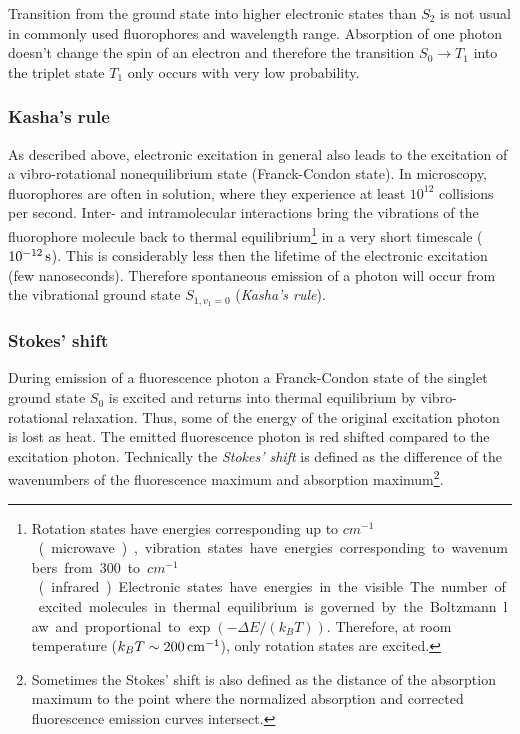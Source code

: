 Transition from the ground state into higher electronic states than
$S_2$ is not usual in commonly used fluorophores and wavelength range.
Absorption of one photon doesn't change the spin of an electron and
therefore the transition $S_0\rightarrow T_1$ into the triplet state
$T_1$ only occurs with very low probability.

\subsubsection{Kasha's rule}
As described above, electronic excitation in general also leads to the
excitation of a vibro-rotational nonequilibrium state (Franck-Condon
state). In microscopy, fluorophores are often in solution, where they
experience at least $10^{12}$ collisions per second. Inter- and
intramolecular interactions bring the vibrations of the fluorophore
molecule back to thermal equilibrium\footnote{Rotation states have
  energies corresponding up to \unit[100]{$cm^{-1}$} (microwave),
  vibration states have energies corresponding to wavenumbers from 300
  to \unit[3000]{$cm^{-1}$} (infrared). Electronic states have
  energies in the visible. The number of excited molecules in thermal
  equilibrium is governed by the Boltzmann law and proportional to
  $\exp(-\Delta E/(k_BT))$. Therefore, at room temperature ($k_B
  T\sim\unit[200]{cm^{-1}}$), only rotation states are excited. } in a
very short timescale ($\unit[10^{-12}]{s}$). This is considerably less
then the lifetime of the electronic excitation (few
nanoseconds). Therefore spontaneous emission of a photon will occur
from the vibrational ground state $S_{1,v_1=0}$ (\emph{Kasha's rule}).

\subsubsection{Stokes' shift}
During emission of a fluorescence photon a Franck-Condon state of the
singlet ground state $S_0$ is excited and returns into thermal
equilibrium by vibro-rotational relaxation. Thus, some of the energy
of the original excitation photon is lost as heat. The emitted
fluorescence photon is red shifted compared to the excitation
photon. Technically the \emph{Stokes' shift} is defined as the
difference of the wavenumbers of the fluorescence maximum and
absorption maximum\footnote{Sometimes the Stokes' shift is also defined
  as the distance of the absorption maximum to the point where the
  normalized absorption and corrected fluorescence emission curves intersect.}.

